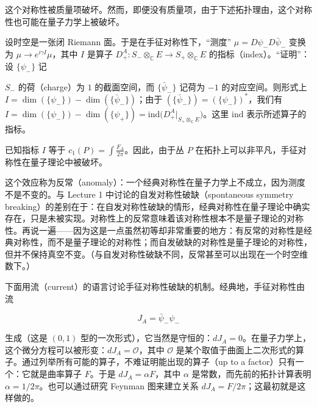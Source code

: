 这个对称性被质量项破坏。然而，即便没有质量项，由于下述拓扑理由，这个对称性也可能在量子力学上被破坏。

设时空是一张闭 Riemann 面。于是在手征对称性下，“测度” $\mu=D\psi_-D\bar\psi_-$ 变换为 $\mu\to e^{i\gamma I}\mu$，其中 $I$ 是算子 $D^A_+:S_-\otimes_{\mathbb{C}}E\to S_+\otimes_{\mathbb{C}}E$ 的指标（index）。“证明”：设 $\{\psi_-\}$ 记

$S_-$ 的荷（charge）为 $1$ 的截面空间，而 $\{\bar\psi_-\}$ 记荷为 $-1$ 的对应空间。则形式上 $I=\dim(\{\psi_-\})-\dim(\{\bar\psi_-\})$；由于 $(\{\bar\psi_-\})=(\{\psi_-\})^*$，我们有 $I=\dim(\{\psi_-\})-\dim(\{\psi_+\})=\mathrm{ind}\big(D^A_+|_{S_+\otimes_{\mathbb{C}}E}\big)$。这里 $\mathrm{ind}$ 表示所述算子的指标。


已知指标 $I$ 等于 $c_1(P)=\int\frac{F_A}{2\pi}$。因此，由于丛 $P$ 在拓扑上可以非平凡，手征对称性在量子理论中被破坏。

这个效应称为反常（anomaly）：一个经典对称性在量子力学上不成立，因为测度不是不变的。与 Lecture 1 中讨论的自发对称性破缺（spontaneous symmetry breaking）的差别在于：在自发对称性破缺的情形，经典对称性在量子理论中确实存在，只是未被实现。对称性上的反常意味着该对称性根本不是量子理论的对称性。再说一遍——因为这是一点虽然初等却非常重要的地方：有反常的对称性是经典对称性，而不是量子理论的对称性；而自发破缺的对称性是量子理论的对称性，但并不保持真空不变。（与自发对称性破缺不同，反常甚至可以出现在一个时空维数下。）

下面用流（current）的语言讨论手征对称性破缺的机制。经典地，手征对称性由流

\begin{equation}
  \tag{6.8}
  \label{eq:6-8}
  J_A=\bar\psi_-\psi_-
\end{equation}

生成（这是 $(0,1)$ 型的一次形式），它当然是守恒的：$dJ_A=0$。在量子力学上，这个微分方程可以被形变：$dJ_A=\mathcal{O}$，其中 $\mathcal{O}$ 是某个取值于曲面上二次形式的算子。通过列举所有可能的算子，不难证明能出现的算子（up to a factor）只有一个：它就是曲率算子 $F$。于是 $dJ_A=\alpha F$，其中 $\alpha$ 是常数，而先前的拓扑计算表明 $\alpha=1/2\pi$。也可以通过研究 Feynman 图来建立关系 $dJ_A=F/2\pi$；这最初就是这样做的。

